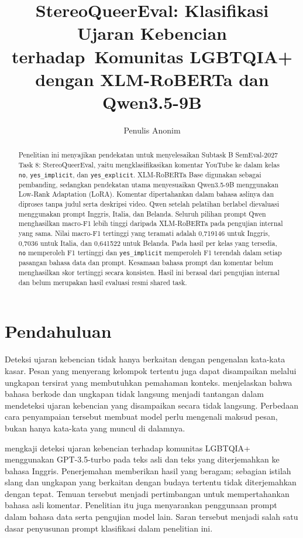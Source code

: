 \documentclass[11pt]{article}
\title{StereoQueerEval: Klasifikasi Ujaran Kebencian terhadap\
Komunitas LGBTQIA+ dengan XLM-RoBERTa dan Qwen3.5-9B}
\author{Penulis Anonim}
\begin{document}
\nolinenumbers
\raggedbottom
\maketitle
\begin{abstract}
Penelitian ini menyajikan pendekatan untuk menyelesaikan Subtask B SemEval-2027 Task 8: StereoQueerEval, yaitu mengklasifikasikan komentar YouTube ke dalam kelas \texttt{no}, \texttt{yes\_implicit}, dan \texttt{yes\_explicit}. XLM-RoBERTa Base digunakan sebagai pembanding, sedangkan pendekatan utama menyesuaikan Qwen3.5-9B menggunakan Low-Rank Adaptation (LoRA). Komentar dipertahankan dalam bahasa aslinya dan diproses tanpa judul serta deskripsi video. Qwen setelah pelatihan berlabel dievaluasi menggunakan prompt Inggris, Italia, dan Belanda. Seluruh pilihan prompt Qwen menghasilkan macro-F1 lebih tinggi daripada XLM-RoBERTa pada pengujian internal yang sama. Nilai macro-F1 tertinggi yang teramati adalah 0,719146 untuk Inggris, 0,7036 untuk Italia, dan 0,641522 untuk Belanda. Pada hasil per kelas yang tersedia, \texttt{no} memperoleh F1 tertinggi dan \texttt{yes\_implicit} memperoleh F1 terendah dalam setiap pasangan bahasa data dan prompt. Kesamaan bahasa prompt dan komentar belum menghasilkan skor tertinggi secara konsisten. Hasil ini berasal dari pengujian internal dan belum merupakan hasil evaluasi resmi shared task.
\end{abstract}

\section{Pendahuluan}
\label{sec:pendahuluan}
Deteksi ujaran kebencian tidak hanya berkaitan dengan pengenalan kata-kata kasar. Pesan yang menyerang kelompok tertentu juga dapat disampaikan melalui ungkapan tersirat yang membutuhkan pemahaman konteks. \citet{elsherief-etal-2021-latent} menjelaskan bahwa bahasa berkode dan ungkapan tidak langsung menjadi tantangan dalam mendeteksi ujaran kebencian yang disampaikan secara tidak langsung. Perbedaan cara penyampaian tersebut membuat model perlu mengenali maksud pesan, bukan hanya kata-kata yang muncul di dalamnya.

\citet{chan-etal-2024-hate} mengkaji deteksi ujaran kebencian terhadap komunitas LGBTQIA+ menggunakan GPT-3.5-turbo pada teks asli dan teks yang diterjemahkan ke bahasa Inggris. Penerjemahan memberikan hasil yang beragam; sebagian istilah slang dan ungkapan yang berkaitan dengan budaya tertentu tidak diterjemahkan dengan tepat. Temuan tersebut menjadi pertimbangan untuk mempertahankan bahasa asli komentar. Penelitian itu juga menyarankan penggunaan prompt dalam bahasa data serta pengujian model lain. Saran tersebut menjadi salah satu dasar penyusunan prompt klasifikasi dalam penelitian ini.
\end{document}
